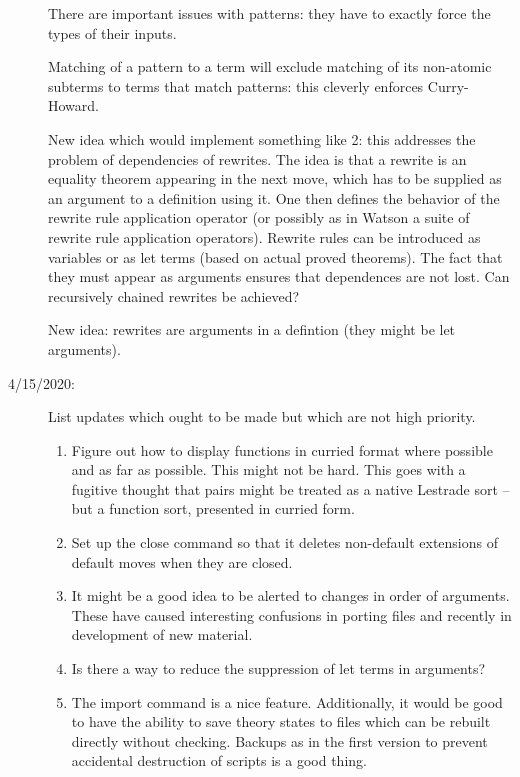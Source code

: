 \documentclass[12pt]{article}
\begin{document}
\begin{description}
There are important issues with patterns:  they have to exactly force the types of their inputs.

Matching of a pattern to a term will exclude matching of its non-atomic subterms to terms that match patterns:  this cleverly enforces Curry-Howard.

New idea which would implement something like 2:  this addresses the problem of dependencies of rewrites.  The idea is that a rewrite is an equality theorem appearing
in the next move, which has to be supplied as an argument to a definition using it.   One then defines the behavior of the rewrite rule application operator (or possibly
as in Watson a suite of rewrite rule application operators).  Rewrite rules can be introduced as variables or as let terms (based on actual proved theorems).  The fact
that they must appear as arguments ensures that dependences are not lost.  Can recursively chained rewrites be achieved?

New idea:  rewrites are arguments in a defintion (they might be let arguments).

\item[4/15/2020:]  List updates which ought to be made but which are not high priority.

\begin{enumerate}

\item Figure out how to display functions in curried format where possible and as far as possible.  This might not be hard.  This goes with a fugitive thought that pairs
might be treated as a native Lestrade sort -- but a function sort, presented in curried form.



\item Set up the close command so that it deletes non-default extensions of default moves when they are closed.

\item It might be a good idea to be alerted to changes in order of arguments.  These have caused interesting confusions in porting files and recently in development of new material.

\item Is there a way to reduce the suppression of let terms in arguments?

\item The import command is a nice feature.  Additionally, it would be good to have the ability to save theory states to files which can be rebuilt directly without checking.  Backups as in the first version to prevent accidental destruction of scripts is a good thing.


\end{enumerate}
\end{description}
\end{document}
